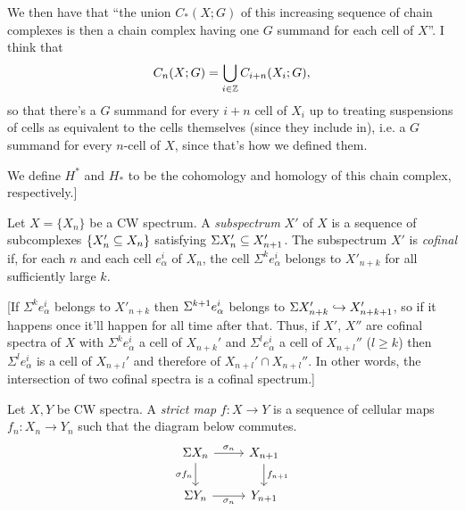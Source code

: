 \documentclass{MetricNotes2023}
\def\subq{\ensuremath\subseteq}
\def\inj{\ensuremath\hookrightarrow}
\def\inte{\ensuremath\mathbb{Z}}
\def\del{\ensuremath\partial}
\def\SIgma{\ensuremath\Sigma}
\begin{document}
We then have that ``the union \(C_*(X ; G)\) of this increasing sequence of chain complexes is then a chain complex having one \(G\) summand for each cell of \(X\)''. I think that 
\[C_n(X ; G)=\bigcup_{i\in \inte}C_{i+n}(X_i; G),\] 
so that there's a \(G\) summand for every \(i+n\) cell of \(X_i\) up to treating suspensions of cells as equivalent to the cells themselves (since they include in), i.e. a \(G\) summand for every \(n\)-cell of \(X\), since that's how we defined them.


We define \(H^*\) and \(H_*\) to be the cohomology and homology of this chain complex, respectively.]

\begin{definition}
Let \(X=\{X_n\}\) be a CW spectrum. A \textit{subspectrum} \(X'\) of \(X\) is a sequence of subcomplexes \(\{X_n'\subq X_n\}\) satisfying \(\Sigma X_n'\subq X_{n+1}'\). The subspectrum \(X'\) is \textit{cofinal} if, for each \(n\) and each cell \(e^i_\alpha\) of \(X_n\), the cell \(\Sigma^k e_\alpha^i\) belongs to \(X'_{n+k}\) for all sufficiently large \(k\).
\end{definition}

[If \(\Sigma^ke^i_\alpha\) belongs to \(X'_{n+k}\) then \(\SIgma^{k+1}e^i_\alpha\) belongs to \(\Sigma X'_{n+k}\inj X'_{n+k+1}\), so if it happens once it'll happen for all time after that. Thus, if \(X'\), \(X''\) are cofinal spectra of \(X\) with \(\Sigma^k e_{\alpha}^i\) a cell of \(X_{n+k}'\) and \(\Sigma^l e_\alpha^i\) a cell of \(X_{n+l}''\) (\(l\geq k\)) then \(\Sigma^l e_\alpha^i\) is a cell of \(X_{n+l}'\) and therefore of \(X_{n+l}'\cap X_{n+l}''\). In other words, the intersection of two cofinal spectra is a cofinal spectrum.]

\begin{definition}
Let \(X, Y\) be CW spectra. A \textit{strict map} \(f : X \to Y\) is a sequence of cellular maps \(f_n : X_n \to Y_n\) such that the diagram below commutes.
\[\begin{tikzcd}
\Sigma X_n \arrow[r, "\sigma_n"] \arrow[d, swap, "\sigma f_n"]  & X_{n+1} \arrow[d, "f_{n+1}"]  \\
\SIgma Y_n \arrow[r, swap, "\sigma_n"]  & Y_{n+1}
\end{tikzcd}\]
\end{definition}
\end{document}
